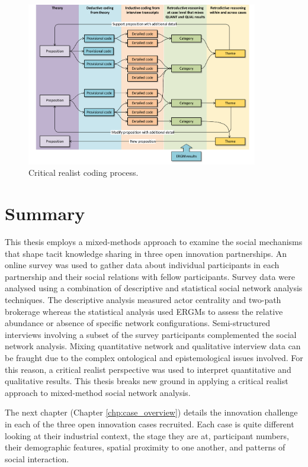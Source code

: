 \begin{figure}
\centering
\includegraphics[width = 0.9\textwidth,
height = 0.7\textheight, keepaspectratio]{Images/CR.pdf}
\caption[Critical realist coding process]{Critical realist coding process.}
\label{fig:coding_process}
\end{figure}

\section{Summary}

This thesis employs a mixed-methods approach to examine the social mechanisms that shape tacit knowledge sharing in three open innovation partnerships. An online survey was used to gather data about individual participants in each partnership and their social relations with fellow participants. Survey data were analysed using a combination of descriptive and statistical social network analysis techniques. The descriptive analysis measured actor centrality and two-path brokerage whereas the statistical analysis used ERGMs to assess the relative abundance or absence of specific network configurations. Semi-structured interviews involving a subset of the survey participants complemented the social network analysis. Mixing quantitative network and qualitative interview data can be fraught due to the complex ontological and epistemological issues involved. For this reason, a critical realist perspective was used to interpret quantitative and qualitative results. This thesis breaks new ground in applying a critical realist approach to mixed-method social network analysis. \medskip

The next chapter (Chapter \ref{chp:case_overview}) details the innovation challenge in each of the three open innovation cases recruited. Each case is quite different looking at their industrial context, the stage they are at, participant numbers, their demographic features, spatial proximity to one another, and patterns of social interaction. 